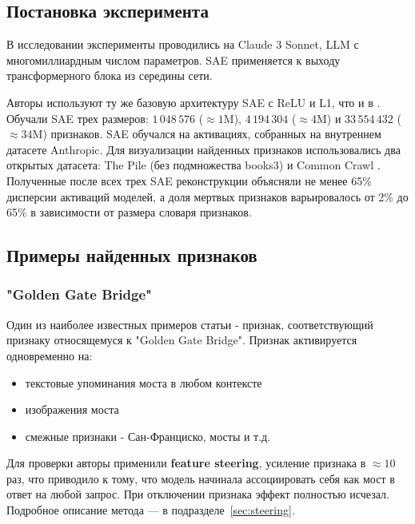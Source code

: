 \documentclass[a4paper,14pt]{extreport}
\begin{document}
\subsection{Постановка эксперимента}

В исследовании \cite{templeton2024scaling} эксперименты проводились на Claude 3 Sonnet, LLM с многомиллиардным числом параметров.
SAE применяется к выходу трансформерного блока из середины сети.

Авторы \cite{templeton2024scaling} используют ту же базовую архитектуру SAE с ReLU и L1, что
и в \cite{bricken2023monosemanticity}. 
Обучали SAE трех размеров: $1\,048\,576$ (${\approx}1$M), $4\,194\,304$ (${\approx}4$M)
и $33\,554\,432$ (${\approx}34$M) признаков. SAE обучался на активациях,
собранных на внутреннем датасете Anthropic. Для визуализации найденных признаков использовались два открытых датасета:
The Pile (без подмножества books3) \cite{gao2020pile}
и Common Crawl \cite{common_crawl}.
Полученные после всех трех SAE реконструкции объясняли не менее 65\% дисперсии активаций моделей,
а доля мертвых признаков варьировалось от 2\% до 65\% в зависимости от размера словаря признаков.

\subsection{Примеры найденных признаков}

\subsubsection{"Golden Gate Bridge"}
\label{sec:ggb}

Один из наиболее известных примеров статьи - признак, соответствующий признаку относящемуся к
"Golden Gate Bridge". Признак активируется одновременно на:
\begin{itemize}
    \item текстовые упоминания моста в любом контексте
    \item изображения моста
    \item смежные признаки - Сан-Франциско, мосты и т.д. 
\end{itemize}

Для проверки авторы применили \textbf{feature steering}, усиление признака
в ${\approx}10$ раз, что приводило к тому, что модель
начинала ассоциировать себя как мост в ответ на любой запрос. При отключении признака
эффект полностью исчезал. Подробное описание метода — в подразделе~\ref{sec:steering}.
\end{document}
